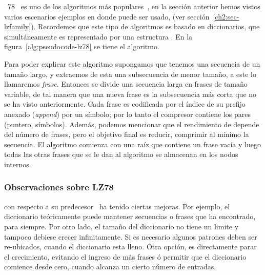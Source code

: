 % 
% 
%
%
\lempelziv~78~\cite{ZivLempel1978} es uno de los algoritmos \LDC más populares~\cite{Begleiter2004}, en la sección anterior hemos vistos varios escenarios ejemplos en donde puede ser usado, (ver sección~\ref{ch2:sec-lzfamily}). Recordemos que este tipo de algoritmos es basado en diccionarios, que simultáneamente es representado por una estructura \trie. En la figura~\ref{alg:pseudocode-lz78} se tiene el algoritmo.



Para poder explicar este algoritmo supongamos que tenemos una secuencia de un tamaño largo, y extraemos de esta una subsecuencia de menor tamaño, a este lo llamaremos \emph{frase}. Entonces se divide una secuencia larga en frases de tamaño variable, de tal manera que una nueva frase es la subsecuencia más corta que no se ha visto anteriormente. Cada frase es codificada por el índice de su prefijo anexado (\emph{append}) por un símbolo; por lo tanto el compresor contiene los pares (puntero, símbolos). Además, podemos mencionar que el  rendimiento de \lzSieteOcho depende del número de frases, pero el objetivo final es reducir, comprimir al mínimo la secuencia. El algoritmo comienza con una raíz que contiene un frase vacía y luego todas las otras frases que se le dan al algoritmo se almacenan en los nodos internos. 



\subsubsection{Observaciones sobre LZ78}

\lzSieteOcho con respecto a su predecesor~\cite{ZivLempel1977} ha tenido ciertas mejoras. Por ejemplo, el diccionario teóricamente puede mantener secuencias o frases que ha encontrado, para siempre. Por otro lado,  el tamaño del diccionario no tiene un limite y tampoco  debiese crecer infinitamente. Si es necesario algunos patrones deben ser re-ubicados, cuando el diccionario esta lleno. Otra opción, es directamente parar el crecimiento, evitando el ingreso de más frases ó permitir que el diccionario comience desde cero, cuando alcanza un cierto número de entradas. 

